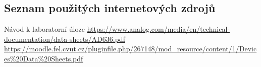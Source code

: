 \documentclass[a4paper,12pt]{article}   %
\begin{document}
\begin{thebibliography}{99}

\subsection*{Seznam použitých internetových zdrojů}
     Návod k laboratorní úloze
     \url{https://www.analog.com/media/en/technical-documentation/data-sheets/AD636.pdf}
     \url{https://moodle.fel.cvut.cz/pluginfile.php/267148/mod_resource/content/1/Devices%20Data%20Sheets.pdf}
\end{thebibliography}
\end{document}
